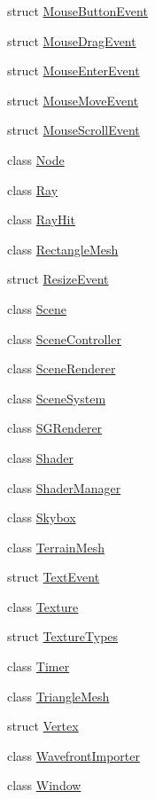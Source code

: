 \begin{DoxyCompactItemize}
\item 
struct \mbox{\hyperlink{structngl_1_1_mouse_button_event}{Mouse\+Button\+Event}}
\item 
struct \mbox{\hyperlink{structngl_1_1_mouse_drag_event}{Mouse\+Drag\+Event}}
\item 
struct \mbox{\hyperlink{structngl_1_1_mouse_enter_event}{Mouse\+Enter\+Event}}
\item 
struct \mbox{\hyperlink{structngl_1_1_mouse_move_event}{Mouse\+Move\+Event}}
\item 
struct \mbox{\hyperlink{structngl_1_1_mouse_scroll_event}{Mouse\+Scroll\+Event}}
\item 
class \mbox{\hyperlink{classngl_1_1_node}{Node}}
\item 
class \mbox{\hyperlink{classngl_1_1_ray}{Ray}}
\item 
class \mbox{\hyperlink{classngl_1_1_ray_hit}{Ray\+Hit}}
\item 
class \mbox{\hyperlink{classngl_1_1_rectangle_mesh}{Rectangle\+Mesh}}
\item 
struct \mbox{\hyperlink{structngl_1_1_resize_event}{Resize\+Event}}
\item 
class \mbox{\hyperlink{classngl_1_1_scene}{Scene}}
\item 
class \mbox{\hyperlink{classngl_1_1_scene_controller}{Scene\+Controller}}
\item 
class \mbox{\hyperlink{classngl_1_1_scene_renderer}{Scene\+Renderer}}
\item 
class \mbox{\hyperlink{classngl_1_1_scene_system}{Scene\+System}}
\item 
class \mbox{\hyperlink{classngl_1_1_s_g_renderer}{S\+G\+Renderer}}
\item 
class \mbox{\hyperlink{classngl_1_1_shader}{Shader}}
\item 
class \mbox{\hyperlink{classngl_1_1_shader_manager}{Shader\+Manager}}
\item 
class \mbox{\hyperlink{classngl_1_1_skybox}{Skybox}}
\item 
class \mbox{\hyperlink{classngl_1_1_terrain_mesh}{Terrain\+Mesh}}
\item 
struct \mbox{\hyperlink{structngl_1_1_text_event}{Text\+Event}}
\item 
class \mbox{\hyperlink{classngl_1_1_texture}{Texture}}
\item 
struct \mbox{\hyperlink{structngl_1_1_texture_types}{Texture\+Types}}
\item 
class \mbox{\hyperlink{classngl_1_1_timer}{Timer}}
\item 
class \mbox{\hyperlink{classngl_1_1_triangle_mesh}{Triangle\+Mesh}}
\item 
struct \mbox{\hyperlink{structngl_1_1_vertex}{Vertex}}
\item 
class \mbox{\hyperlink{classngl_1_1_wavefront_importer}{Wavefront\+Importer}}
\item 
class \mbox{\hyperlink{classngl_1_1_window}{Window}}
\end{DoxyCompactItemize}
